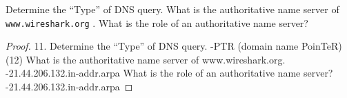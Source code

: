 \documentclass[../../main.tex]{subfiles}
\begin{document}
\begin{wts}
Determine the “Type” of DNS query. What is the authoritative name server of \lstinline{www.wireshark.org} . What is the role of an authoritative name server?
\end{wts}
\begin{proof}
11. Determine the “Type” of DNS query. -PTR (domain name PoinTeR) (12)
What is the authoritative name server of www.wireshark.org. -21.44.206.132.in-addr.arpa
What is the role of an authoritative name server? -21.44.206.132.in-addr.arpa



\end{proof}
\end{document}
